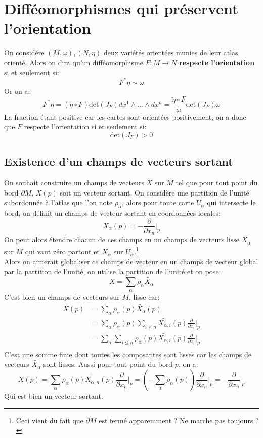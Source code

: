    \section{Difféomorphismes qui préservent l'orientation}
      On considére \( (M, \omega), (N, \eta) \) deux variétés orientées munies de leur atlas orienté. Alors on dira qu'un difféomorphisme \( F : M \longrightarrow N \) \textbf{respecte l'orientation} si et seulement si:
      \[ 
         F^*\eta \sim \omega
      \]
      Or on a:
      \[ 
         F^*\eta = (\widetilde{\eta} \circ F)\text{det}(J_F)dx^1 \wedge \ldots \wedge dx^n = \frac{\widetilde{\eta} \circ F}{\widetilde{\omega}}\text{det}(J_F) \omega
      \]
      La fraction étant positive car les cartes sont orientées positivement, on a donc que \( F \) respecte l'orientation si et seulement si:
      \[ 
         \text{det}(J_F) > 0
      \]
   
   \subsection*{Existence d'un champs de vecteurs sortant}
      On souhait construire un champs de vecteurs $X$ sur $M$ tel que pour tout point du bord $\partial M$, $X(p)$ soit un vecteur sortant. On considère une partition de l'unité subordonnée à l'atlas que l'on note $\rho_\alpha$, alors pour toute carte $U_\alpha$ qui intersecte le bord, on définit un champs de vecteur sortant en coordonnées locales:
      $$
         X_\alpha(p) = -\frac{\partial}{\partial x_n}\bigg|_p
      $$
      {\color{red}On peut alors étendre chacun de ces champs en un champs de vecteurs lisse $\widetilde{X_\alpha}$ sur $M$ qui vaut zéro partout et $X_\alpha$ sur $U_\alpha$.}\footnote{Ceci vient du fait que $\partial M$ est fermé apparemment ? Ne marche pas toujours ?}\\
      
      Alors on aimerait globaliser ce champs de vecteur en un champs de vecteur global par la partition de l'unité, on utilise la partition de l'unité et on pose:
      $$
         X = \sum_\alpha \rho_\alpha \widetilde{X_\alpha}
      $$
      C'est bien un champs de vecteurs sur $M$, lisse car: 
      \begin{align*}
         X(p) &= \sum_\alpha \rho_\alpha(p) \widetilde{X_\alpha}(p) \\
         &= \sum_\alpha \rho_\alpha(p) \sum_{i \leq n}\widetilde{X_{\alpha,i}}(p)\frac{\partial}{\partial x_i}\bigg|_p\\
         &= \sum_\alpha\sum_{i \leq n} \rho_\alpha(p)\widetilde{X_{\alpha,i}}(p)\frac{\partial}{\partial x_i}\bigg|_p\\
      \end{align*}
      C'est une somme finie dont toutes les composantes sont lisses car les champs de vecteurs $\widetilde{X_\alpha}$ sont lisses. Aussi pour tout point du bord $p$, on a:
      $$
         X(p) = \sum_\alpha \rho_\alpha(p)\widetilde{X_{\alpha,n}}(p)\frac{\partial}{\partial x_n}\bigg|_p = \left(- \sum_\alpha \rho_\alpha(p)\right)\frac{\partial}{\partial x_n}\bigg|_p = -\frac{\partial}{\partial x_n}\bigg|_p
      $$
      Qui est bien un vecteur sortant.
